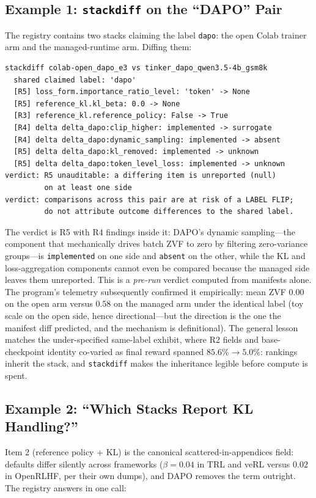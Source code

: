 \documentclass{article}
\begin{document}
\subsection{Example 1: \texttt{stackdiff} on the ``DAPO'' Pair}
\label{sec:p6-worked-dapo}
The registry contains two stacks claiming the label \texttt{dapo}: the open
Colab trainer arm and the managed-runtime arm. Diffing them:

\begin{lstlisting}[basicstyle=\ttfamily\scriptsize, frame=single,
  caption={\texttt{stackdiff colab-open_dapo_e3
  tinker_dapo_qwen3.5-4b_gsm8k} (abridged: R2 backend lines omitted).},
  label={lst:p6-stackdiff}]
stackdiff colab-open_dapo_e3 vs tinker_dapo_qwen3.5-4b_gsm8k
  shared claimed label: 'dapo'
  [R5] loss_form.importance_ratio_level: 'token' -> None
  [R5] reference_kl.kl_beta: 0.0 -> None
  [R3] reference_kl.reference_policy: False -> True
  [R4] delta delta_dapo:clip_higher: implemented -> surrogate
  [R4] delta delta_dapo:dynamic_sampling: implemented -> absent
  [R5] delta delta_dapo:kl_removed: implemented -> unknown
  [R5] delta delta_dapo:token_level_loss: implemented -> unknown
verdict: R5 unauditable: a differing item is unreported (null)
         on at least one side
verdict: comparisons across this pair are at risk of a LABEL FLIP;
         do not attribute outcome differences to the shared label.
\end{lstlisting}

The verdict is R5 with R4 findings inside it: DAPO's dynamic sampling---the
component that mechanically drives batch ZVF to zero by filtering
zero-variance groups---is \texttt{implemented} on one side and \texttt{absent}
on the other, while the KL and loss-aggregation components cannot even be
compared because the managed side leaves them unreported. This is a
\emph{pre-run} verdict computed from manifests alone. The program's telemetry
subsequently confirmed it empirically: mean ZVF $0.00$ on the open arm versus
$0.58$ on the managed arm under the identical label (toy scale on the open
side, hence directional---but the direction is the one the manifest diff
predicted, and the mechanism is definitional). The general lesson matches the
under-specified same-label exhibit, where R2 fields and base-checkpoint identity
co-varied as final reward spanned $85.6\% \to 5.0\%$: rankings inherit the stack, and \texttt{stackdiff} makes
the inheritance legible before compute is spent.

\subsection{Example 2: ``Which Stacks Report KL Handling?''}
\label{sec:p6-worked-kl}
Item 2 (reference policy + KL) is the canonical scattered-in-appendices
field: defaults differ silently across frameworks ($\beta{=}0.04$ in TRL and
veRL versus $0.02$ in OpenRLHF, per their own dumps), and DAPO removes the
term outright. The registry answers in one call:
\end{document}
